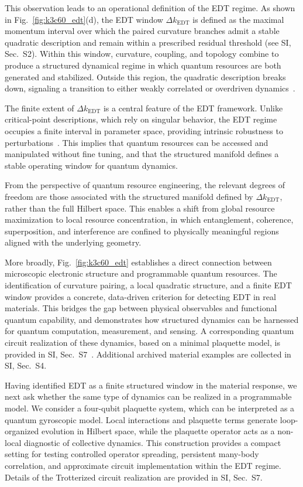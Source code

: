 \documentclass[twocolumn,10pt]{article}
\begin{document}
This observation leads to an operational definition of the EDT regime. As shown in Fig.~\ref{fig:k3c60_edt}(d), the EDT window $\Delta k_{\mathrm{EDT}}$ is defined as the maximal momentum interval over which the paired curvature branches admit a stable quadratic description and remain within a prescribed residual threshold (see SI, Sec.~S2). Within this window, curvature, coupling, and topology combine to produce a structured dynamical regime in which quantum resources are both generated and stabilized. Outside this region, the quadratic description breaks down, signaling a transition to either weakly correlated or overdriven dynamics~\cite{Larkin1969,Swingle2018}.

The finite extent of $\Delta k_{\mathrm{EDT}}$ is a central feature of the EDT framework. Unlike critical-point descriptions, which rely on singular behavior, the EDT regime occupies a finite interval in parameter space, providing intrinsic robustness to perturbations~\cite{Altman2015}. This implies that quantum resources can be accessed and manipulated without fine tuning, and that the structured manifold defines a stable operating window for quantum dynamics.

From the perspective of quantum resource engineering, the relevant degrees of freedom are those associated with the structured manifold defined by $\Delta k_{\mathrm{EDT}}$, rather than the full Hilbert space. This enables a shift from global resource maximization to local resource concentration, in which entanglement, coherence, superposition, and interference are confined to physically meaningful regions aligned with the underlying geometry.

More broadly, Fig.~\ref{fig:k3c60_edt} establishes a direct connection between microscopic electronic structure and programmable quantum resources. The identification of curvature pairing, a local quadratic structure, and a finite EDT window provides a concrete, data-driven criterion for detecting EDT in real materials. This bridges the gap between physical observables and functional quantum capability, and demonstrates how structured dynamics can be harnessed for quantum computation, measurement, and sensing. A corresponding quantum circuit realization of these dynamics, based on a minimal plaquette model, is provided in SI, Sec.~S7~\cite{Lloyd1996,Childs2019}. Additional archived material examples are collected in SI, Sec.~S4.


Having identified EDT as a finite structured window in the material response, we next ask whether the same type of dynamics can be realized in a programmable model. We consider a four-qubit plaquette system, which can be interpreted as a quantum gyroscopic model. Local interactions and plaquette terms generate loop-organized evolution in Hilbert space, while the plaquette operator acts as a non-local diagnostic of collective dynamics. This construction provides a compact setting for testing controlled operator spreading, persistent many-body correlation, and approximate circuit implementation within the EDT regime. Details of the Trotterized circuit realization are provided in SI, Sec.~S7.
\end{document}
